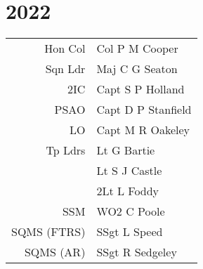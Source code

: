 \chapter*{2022}

\vspace*{10mm}

\begin{center}
  \small
  \begin{tabular}{rl}
    Hon Col & Col P M Cooper \\
    Sqn Ldr & Maj C G Seaton \\
    2IC & Capt S P Holland \\
    PSAO & Capt D P Stanfield \\
    LO & Capt M R Oakeley \\
    Tp Ldrs & Lt G Bartie \\
      & Lt S J Castle \\
      & 2Lt L Foddy \\
    SSM & WO2 C Poole \\
    SQMS (FTRS) & SSgt L Speed \\
    SQMS (AR) & SSgt R Sedgeley \\
  \end{tabular}
\end{center}

\vspace*{5mm}

